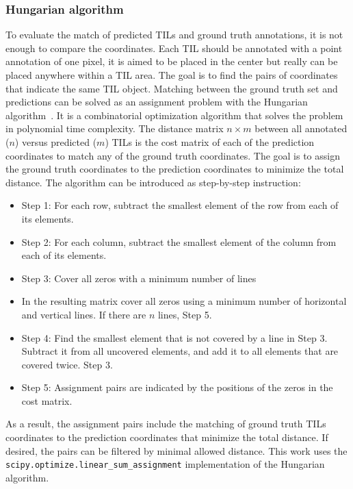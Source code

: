 \subsubsection{Hungarian algorithm}
To evaluate the match of predicted TILs and ground truth annotations,
it is not enough to compare the coordinates. Each TIL should be annotated
with a point annotation of one pixel, it is aimed to be placed in the center
but really can be placed anywhere within a TIL area.
The goal is to find the pairs of coordinates that indicate the same TIL object.
Matching between the ground truth set and predictions can be solved as an assignment
problem with the Hungarian algorithm~\cite{kuhn1955hungarian}. It is a combinatorial
optimization algorithm that solves the problem in polynomial time complexity.
The distance matrix $n\times m$ between all annotated ($n$) versus predicted ($m$)
TILs is the cost matrix of each of the prediction coordinates to match any of the ground
truth coordinates. The goal is to assign the ground truth coordinates to the prediction
coordinates to minimize the total distance. The algorithm can be introduced as step-by-step instruction:
\begin{itemize}
  \itemsep0em 
  \item Step 1: For each row, subtract the smallest element of the row from each of its elements.
  \item Step 2: For each column, subtract the smallest element of the column from each of its elements.
  \item Step 3: Cover all zeros with a minimum number of lines
  \item[] In the resulting matrix cover all zeros using a minimum number of horizontal and vertical lines. 
  If there are $n$ lines, Step 5.
  \item Step 4: Find the smallest element that is not covered by a line in Step 3.
  Subtract it from all uncovered elements, and add it to all elements that are covered twice. Step 3.
  \item Step 5: Assignment pairs are indicated by the positions of the zeros in the cost matrix. 
\end{itemize}
As a result, the assignment pairs include the matching of ground truth TILs coordinates to the
prediction coordinates that minimize the total distance. If desired, the pairs can be filtered
by minimal allowed distance. This work uses the \verb+scipy.optimize.linear_sum_assignment+
implementation of the Hungarian algorithm.

